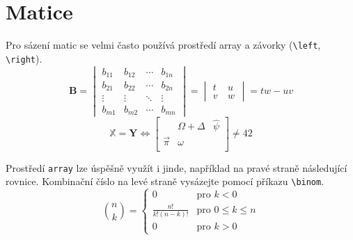 \documentclass[11pt, twocolumn, a4paper]{article}
\theoremstyle{definition}
\begin{document}
\section{Matice}
Pro sázení matic se velmi často používá prostředí array a závorky (\verb|\left|, \verb|\right|).
\[
    \mathbf{B} =
    \begin{vmatrix}

        b_{11} & b_{12} & \cdots & b_{1n} \\
        b_{21} & b_{22} & \cdots & b_{2n} \\
        \vdots & \vdots & \ddots & \vdots \\
        b_{m1} & b_{m2} & \cdots & b_{mn} 

    \end{vmatrix}
    =
    \begin{vmatrix}

        t & u~\\
        v~& w 
    
    \end{vmatrix}
    =
    tw - uv
\]
\[
    \mathbb{X} = \mathbf{Y} \Longleftrightarrow 
    \begin{bmatrix}
            & \Omega + \Delta & \hat{\psi } \\
            \vec{\pi} & \omega & \\
    \end{bmatrix}
    \neq 42
\]
\par Prostředí \verb|array| lze úspěšně využít i jinde, například na pravé straně následující
rovnice. Kombinační číslo na levé straně vysázejte pomocí příkazu \verb|\binom|.
\[
    \binom{n}{k} = 
    \begin{cases}
        0 & \textrm{pro }k<0 \\
        \frac{n!}{k!(n-k)!} & \textrm{pro }0 \leq k \leq n \\
        0 & \textrm{pro }k>0
    \end{cases}
\] 
\end{document}
